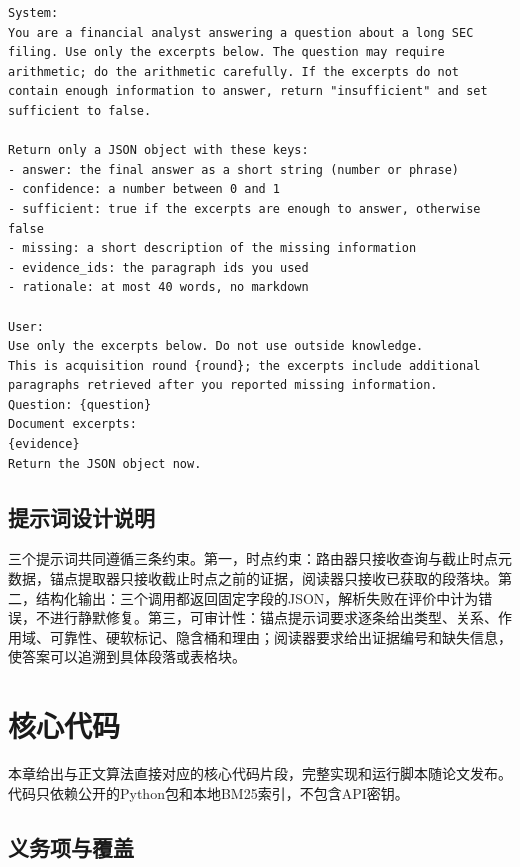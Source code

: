 \begin{lstlisting}[basicstyle=\ttfamily\scriptsize,breaklines=true,columns=fullflexible,frame=single,numbers=none]
System:
You are a financial analyst answering a question about a long SEC
filing. Use only the excerpts below. The question may require
arithmetic; do the arithmetic carefully. If the excerpts do not
contain enough information to answer, return "insufficient" and set
sufficient to false.

Return only a JSON object with these keys:
- answer: the final answer as a short string (number or phrase)
- confidence: a number between 0 and 1
- sufficient: true if the excerpts are enough to answer, otherwise false
- missing: a short description of the missing information
- evidence_ids: the paragraph ids you used
- rationale: at most 40 words, no markdown

User:
Use only the excerpts below. Do not use outside knowledge.
This is acquisition round {round}; the excerpts include additional
paragraphs retrieved after you reported missing information.
Question: {question}
Document excerpts:
{evidence}
Return the JSON object now.
\end{lstlisting}

\section{提示词设计说明}

三个提示词共同遵循三条约束。第一，时点约束：路由器只接收查询与截止时点元数据，锚点提取器只接收截止时点之前的证据，阅读器只接收已获取的段落块。第二，结构化输出：三个调用都返回固定字段的JSON，解析失败在评价中计为错误，不进行静默修复。第三，可审计性：锚点提示词要求逐条给出类型、关系、作用域、可靠性、硬软标记、隐含桶和理由；阅读器要求给出证据编号和缺失信息，使答案可以追溯到具体段落或表格块。

\chapter{核心代码}
\label{app:code}

本章给出与正文算法直接对应的核心代码片段，完整实现和运行脚本随论文发布。代码只依赖公开的Python包和本地BM25索引，不包含API密钥。

\section{义务项与覆盖}

